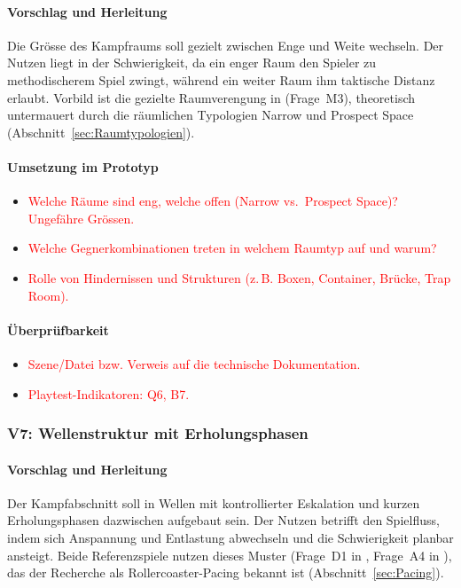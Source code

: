 \documentclass[../Main.tex]{subfiles}
\begin{document}
\paragraph{Vorschlag und Herleitung}
Die Grösse des Kampfraums soll gezielt zwischen Enge und Weite wechseln. Der Nutzen liegt in der Schwierigkeit, da ein enger Raum den Spieler zu methodischerem Spiel zwingt, während ein weiter Raum ihm taktische Distanz erlaubt. Vorbild ist die gezielte Raumverengung in  (Frage~M3), theoretisch untermauert durch die räumlichen Typologien Narrow und Prospect Space (Abschnitt~\ref{sec:Raumtypologien}).

\paragraph{Umsetzung im Prototyp}
\begin{itemize}[leftmargin=1.5cm]
    \item \textcolor{red}{Welche Räume sind eng, welche offen (Narrow vs.\ Prospect Space)? Ungefähre Grössen.}
    \item \textcolor{red}{Welche Gegnerkombinationen treten in welchem Raumtyp auf und warum?}
    \item \textcolor{red}{Rolle von Hindernissen und Strukturen (z.\,B. Boxen, Container, Brücke, Trap Room).}
\end{itemize}

\paragraph{Überprüfbarkeit}
\begin{itemize}[leftmargin=1.5cm]
    \item \textcolor{red}{Szene/Datei bzw. Verweis auf die technische Dokumentation.}
    \item \textcolor{red}{Playtest-Indikatoren: Q6, B7.}
\end{itemize}

\subsubsection{V7: Wellenstruktur mit Erholungsphasen} \label{sec:V7}

\paragraph{Vorschlag und Herleitung}
Der Kampfabschnitt soll in Wellen mit kontrollierter Eskalation und kurzen Erholungsphasen dazwischen aufgebaut sein. Der Nutzen betrifft den Spielfluss, indem sich Anspannung und Entlastung abwechseln und die Schwierigkeit planbar ansteigt. Beide Referenzspiele nutzen dieses Muster (Frage~D1 in , Frage~A4 in ), das der Recherche als Rollercoaster-Pacing bekannt ist (Abschnitt~\ref{sec:Pacing}).
\end{document}
